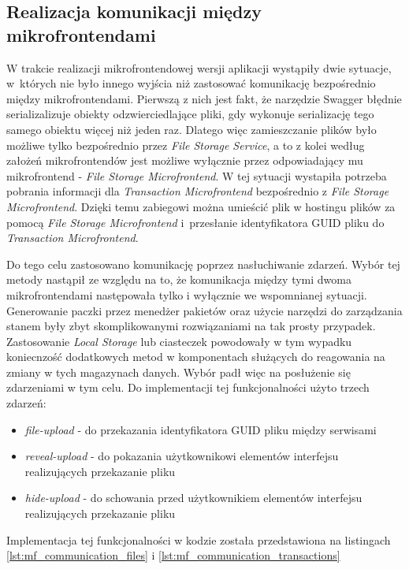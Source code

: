 \documentclass{SGGW-thesis}
\begin{document}
{  \subsection{Realizacja komunikacji między mikrofrontendami}
  W trakcie realizacji mikrofrontendowej wersji aplikacji wystąpiły dwie sytuacje, w~których nie było innego wyjścia niż zastosować komunikację bezpośrednio między mikrofrontendami.
  Pierwszą z nich jest fakt, że narzędzie Swagger błędnie serializalizuje obiekty odzwierciedlające pliki, gdy wykonuje serializację tego samego obiektu więcej niż jeden raz. Dlatego więc zamieszczanie plików było możliwe tylko bezpośrednio przez \textit{File Storage Service}, a to z kolei według założeń mikrofrontendów jest możliwe wyłącznie przez odpowiadający mu mikrofrontend - \textit{File Storage Microfrontend}. W tej sytuacji wystapiła potrzeba pobrania informacji dla \textit{Transaction Microfrontend} bezpośrednio z \textit{File Storage Microfrontend}. Dzięki temu zabiegowi można umieścić plik w hostingu plików za pomocą \textit{File Storage Microfrontend} i~przesłanie identyfikatora GUID pliku do \textit{Transaction Microfrontend}.

  Do tego celu zastosowano komunikację poprzez nasłuchiwanie zdarzeń. Wybór tej metody nastąpił ze względu na to, że komunikacja między tymi dwoma mikrofrontendami następowała tylko i wyłącznie we wspomnianej sytuacji. Generowanie paczki przez menedżer pakietów oraz użycie narzędzi do zarządzania stanem były zbyt skomplikowanymi rozwiązaniami na tak prosty przypadek. Zastosowanie \textit{Local Storage} lub ciasteczek powodowały w tym wypadku koniecnzość dodatkowych metod w komponentach służących do reagowania na zmiany w tych magazynach danych. Wybór padł więc na posłużenie się zdarzeniami w tym celu. Do implementacji tej funkcjonalności użyto trzech zdarzeń:

  \begin{itemize}
    \item \textit{file-upload} - do przekazania identyfikatora GUID pliku między serwisami
    \item \textit{reveal-upload} - do pokazania użytkownikowi elementów interfejsu realizujących przekazanie pliku
    \item \textit{hide-upload} - do schowania przed użytkownikiem elementów interfejsu realizujących przekazanie pliku
  \end{itemize}

  Implementacja tej funkcjonalności w kodzie została przedstawiona na listingach \cref{lst:mf_communication_files} i \cref{lst:mf_communication_transactions}

}
\end{document}
